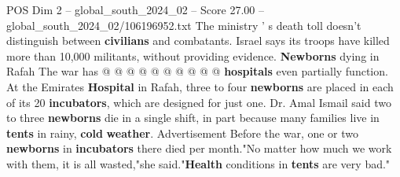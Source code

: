 \begin{textsample}{POS Dim 2 – global\_south\_2024\_02 – Score 27.00 – global\_south\_2024\_02/106196952.txt}
The ministry ' s death toll doesn't distinguish between \textbf{civilians} and combatants.
Israel says its troops have killed more than 10,000 militants, without providing evidence. \textbf{Newborns} dying in Rafah The war has @ @ @ @ @ @ @ @ @ @ \textbf{hospitals} even partially function.
At the Emirates \textbf{Hospital} in Rafah, three to four \textbf{newborns} are placed in each of its 20 \textbf{incubators}, which are designed for just one.
Dr.
Amal Ismail said two to three \textbf{newborns} die in a single shift, in part because many families live in \textbf{tents} in rainy, \textbf{cold} \textbf{weather}.
Advertisement Before the war, one or two \textbf{newborns} in \textbf{incubators} there died per month."No matter how much we work with them, it is all wasted,"she said."\textbf{Health} conditions in \textbf{tents} are very bad."

\end{textsample}

